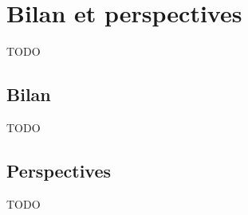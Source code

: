 
\chapter{Bilan et perspectives}
\label{sec:end}


TODO


\section{Bilan}
\label{sec:bilan}


TODO


\section{Perspectives}
\label{sec:after}


TODO

